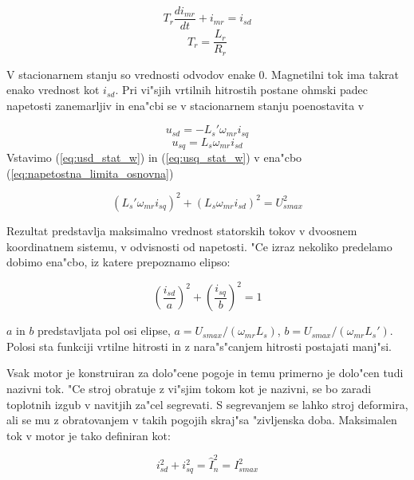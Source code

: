 \documentclass[journal,a4paper,twoside]{sty/IEEEtran}
\begin{document}
\begin{equation}
T_r\frac{di_{mr}}{dt}+i_{mr} =i_{sd}
\label{eq:imr}
\end{equation}
\begin{equation}
T_r=\frac{L_r}{R_r}
\label{eq:Tr}
\end{equation}


V stacionarnem stanju so vrednosti odvodov enake 0. Magnetilni tok ima takrat enako vrednost kot $i_{sd}$. Pri vi"sjih vrtilnih hitrostih postane ohmski padec napetosti zanemarljiv in ena"cbi se v stacionarnem stanju poenostavita v

\begin{equation}
u_{sd}= - L_s' \omega_{mr} i_{sq}
\label{eq:usd_stat_w}
\end{equation}
\begin{equation}
u_{sq}=  L_s \omega_{mr}i_{sd}
\label{eq:usq_stat_w}
\end{equation}
 Vstavimo (\ref{eq:usd_stat_w}) in (\ref{eq:usq_stat_w}) v ena"cbo (\ref{eq:napetostna_limita_osnovna})

\begin{equation}
(L_s' \omega_{mr} i_{sq})^2+(L_s \omega_{mr}i_{sd})^2= U_{smax}^2
\label{eq:napetostnalim1}
\end{equation}

Rezultat predstavlja maksimalno vrednost statorskih tokov v dvoosnem koordinatnem sistemu, v odvisnosti od napetosti. "Ce izraz nekoliko predelamo dobimo ena"cbo, iz katere prepoznamo elipso: 

\begin{equation}
(\frac{i_{sd}}{a})^2+(\frac{i_{sq}}{b})^2 = 1
\label{eq:napetostnalim}
\end{equation}

$a$ in $b$ predstavljata pol osi elipse, $a=U_{smax}/(\omega_{mr}L_s)$, $b=U_{smax}/(\omega_{mr}L_s')$. Polosi sta funkciji vrtilne hitrosti in z nara"s"canjem hitrosti postajati manj"si.

Vsak motor je konstruiran za dolo"cene pogoje in temu primerno je dolo"cen tudi nazivni tok. "Ce stroj obratuje z vi"sjim tokom kot je nazivni, se bo zaradi toplotnih izgub v navitjih za"cel segrevati. S segrevanjem se lahko stroj deformira, ali se mu z obratovanjem v takih pogojih skraj"sa "zivljenska doba. Maksimalen tok v motor je tako definiran kot:

\begin{equation}
i_{sd}^2+i_{sq}^2=\hat{I}_{n}^2=I_{smax}^2
\label{eq:tokovnalim}
\end{equation}
\end{document}
